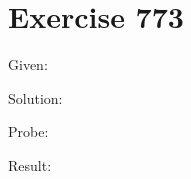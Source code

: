 \documentclass[a4paper, 10pt]{scrartcl}
\begin{document}
\section{Exercise 773}

Given:

Solution:

Probe:

Result:
\end{document}
